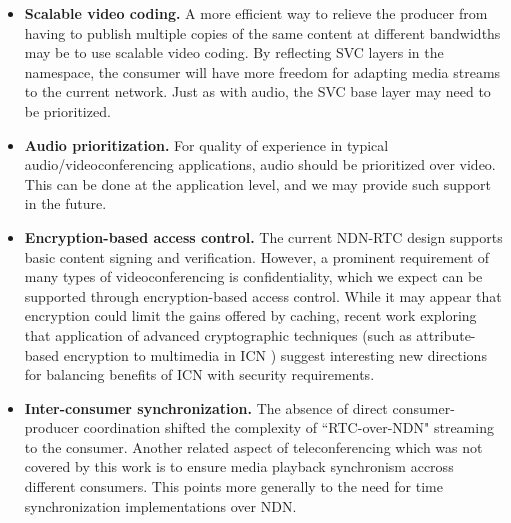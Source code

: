 \documentclass{icn/sig-alternate-2013} %
\newcommand{\ndnrtcName}{NDN-RTC} %
\begin{document}
\begin{itemize}[label={}]
\item \textbf{Scalable video coding.} A more efficient way to relieve the producer from having to publish multiple copies of the same content at different bandwidths may be to use scalable video coding. By reflecting SVC layers in the namespace, the consumer will have more freedom for adapting media streams to the current network. Just as with audio, the SVC base layer may need to be prioritized. 

\item \textbf{Audio prioritization.}  For quality of experience in typical audio/videoconferencing applications, audio should be prioritized over video.  This can be done at the application level, and we may provide such support in the future. %

\item \textbf{Encryption-based access control.} The current \ndnrtcName{} design supports basic content signing and verification. However, a prominent requirement of many types of videoconferencing is confidentiality, which we expect can be supported through encryption-based access control.  While it may appear that encryption could limit the gains offered by caching, recent work exploring that application of advanced cryptographic techniques (such as attribute-based encryption to multimedia in ICN \cite{papanis2014use}) suggest interesting new directions for balancing benefits of ICN with security requirements. 

\item \textbf{Inter-consumer synchronization.} The absence of direct consumer-producer coordination shifted the complexity of ``RTC-over-NDN" streaming to the consumer. Another related aspect of teleconferencing which was not covered by this work is to ensure media playback synchronism accross different consumers.   This points more generally to the need for time synchronization implementations over NDN. 

\end{itemize}
\end{document}
